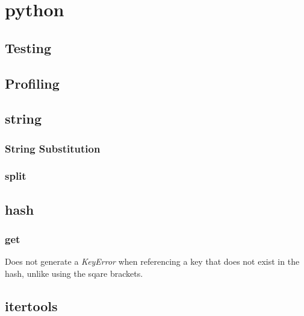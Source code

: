 \documentclass[12pt]{article}
\begin{document}
\maketitle

\section{python}

\subsection{Testing}
\scriptsize


\subsection{Profiling}


\subsection{string}

\subsubsection{String Substitution}



\subsubsection{split}


\subsection{hash}

\subsubsection{get}

Does not generate a \emph{KeyError} when referencing a key that does not exist in the hash, unlike using the sqare brackets.



\subsection{itertools}
\end{document}
